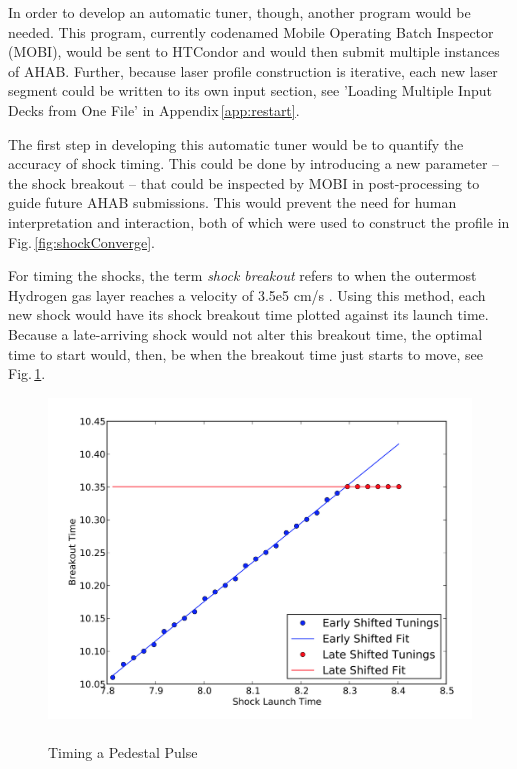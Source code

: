 In order to develop an automatic tuner, though, another program would be needed.  This program, currently codenamed Mobile Operating Batch Inspector (MOBI), would be sent to HTCondor and would then submit multiple instances of AHAB.  Further, because laser profile construction is iterative, each new laser segment could be written to its own input section, see 'Loading Multiple Input Decks from One File' in Appendix\,\ref{app:restart}.   

The first step in developing this automatic tuner would be to quantify the accuracy of shock timing.  This could be done by introducing a new parameter -- the shock breakout -- that could be inspected by MOBI in post-processing to guide future AHAB submissions.  This would prevent the need for human interpretation and interaction, both of which were used to construct the profile in Fig.\,\ref{fig:shockConverge}.

For timing the shocks, the term \textit{shock breakout} refers to when the outermost Hydrogen gas layer reaches a velocity of 3.5e5 cm/s \citep{terryThesis}.  Using this method, each new shock would have its shock breakout time plotted against its launch time.  Because a late-arriving shock would not alter this breakout time, the optimal time to start would, then, be when the breakout time just starts to move, see Fig.\,\ref{fig:shockBreakout}.

\begin{figure}	
	\centering
	\includegraphics[width=.621\textwidth]{graphics/shockBreakout.png} 
	\caption[Automatically Timing Pedestal Pulses]{ \\ Timing a Pedestal Pulse \\  }
	\label{fig:shockBreakout}
\end{figure}

